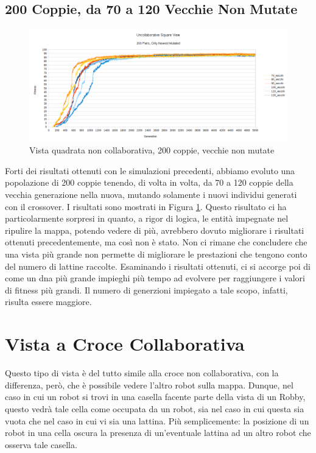 \subsection{200 Coppie, da 70 a 120 Vecchie Non Mutate}
\begin{figure}[ht]
	\centering
	\includegraphics[scale=0.7,angle=90]{imgs/square_nc_200_pairs_70_120_old_not_mutated.png}
	\caption{Vista quadrata non collaborativa, 200 coppie, vecchie non mutate}
	\label{figure:square_nc_200_70_120_non}
\end{figure}
Forti dei risultati ottenuti con le simulazioni precedenti, abbiamo evoluto una
popolazione di 200 coppie tenendo, di volta in volta, da 70 a 120 coppie della
vecchia generazione nella nuova, mutando solamente i nuovi individui generati
con il crossover.\newline
I risultati sono mostrati in Figura
\ref{figure:square_nc_200_70_120_non}. Questo risultato ci ha particolarmente
sorpresi in quanto, a rigor di logica, le entità impegnate nel ripulire la
mappa, potendo vedere di più, avrebbero dovuto migliorare i risultati ottenuti
precedentemente, ma così non è stato. Non ci rimane che concludere che una vista
più grande non permette di migliorare le prestazioni che tengono conto del
numero di lattine raccolte.\newline
Esaminando i risultati ottenuti, ci si accorge poi di come un dna più grande
impieghi più tempo ad evolvere per raggiungere i valori di fitness più grandi.
Il numero di generzioni impiegato a tale scopo, infatti, risulta essere
maggiore.



\clearpage



\section{Vista a Croce Collaborativa}
Questo tipo di vista è del tutto simile alla croce non collaborativa, con la
differenza, però, che è possibile vedere l'altro robot sulla mappa. Dunque, nel
caso in cui un robot si trovi in una casella facente parte della vista di un
Robby, questo vedrà tale cella come occupata da un robot, sia nel caso in cui
questa sia vuota che nel caso in cui vi sia una lattina. Più semplicemente: la
posizione di un robot in una cella oscura la presenza di un'eventuale lattina ad
un altro robot che osserva tale casella.

